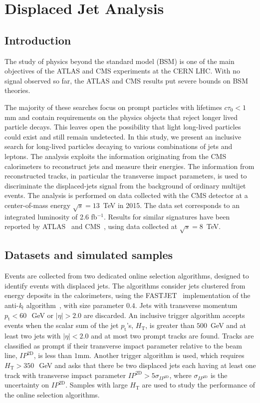 \chapter{Displaced Jet Analysis \label{ch:analysis}}

\section{Introduction}

The study of physics beyond the standard model (BSM) is one of the main
objectives of the ATLAS and CMS experiments at the CERN LHC. With no
signal observed so far, the ATLAS and CMS results put severe bounds on
BSM theories.

The majority of these searches focus on prompt particles with
lifetimes $c\tau_0<1$mm and contain requirements on the
physics objects that reject longer lived particle
decays. This leaves open the possibility that light long-lived particles
could exist and still remain undetected. In this study, we present an
inclusive search for long-lived particles decaying to various
combinations of jets and leptons. The analysis exploits the
information originating from the CMS calorimeters to reconstruct jets
and measure their energies. The information from reconstructed tracks,
in particular the transverse impact parameters, is used to
discriminate the displaced-jets signal from the background of ordinary
multijet events.  The analysis is performed on data collected with the
CMS detector at a center-of-mass energy $\sqrt{s}=13$~TeV in 2015. The
data set corresponds to an integrated luminosity of
2.6 fb$^{-1}$. Results for similar signatures have been reported by
ATLAS~\cite{PhysRevD.92.012010,Aad:2015rba} and
CMS~\cite{CMS:2014wda}, using data collected at $\sqrt{s}=8$~TeV.

\section{Datasets and simulated samples}
\label{sec:samples}

Events are collected from two dedicated online selection algorithms,
designed to identify events with displaced jets.  The algorithms
consider jets clustered from energy deposits in the calorimeters,
using the FASTJET~\cite{fastjet} implementation of the
anti-\textit{k}$_{\textit{t}}$ algorithm~\cite{Cacciari:2008gp}, with
size parameter $0.4$. Jets with transverse momentum $p_{\textrm{t}}<60~$~GeV or
$|\eta|>2.0$ are discarded.  An inclusive trigger algorithm accepts
events when the scalar sum of the jet $p_{\textrm{t}}$'s, $H_{\textrm{T}}$, is
greater than $500$~GeV and at least two jets with $|\eta|<2.0$ and at
most two prompt tracks are found. Tracks are classified as prompt if
their transverse impact parameter relative to the beam line,
$IP^{\textrm{2D}}$, is less than $1$mm.  Another trigger
algorithm is used, which requires $H_{\textrm{T}}>350~$~GeV and asks
that there be two displaced jets each having at least one track with
transverse impact parameter
$IP^{\textrm{2D}}>5\sigma_{IP^{\textrm{2D}}}$,
where $\sigma_{IP^{\textrm{2D}}}$ is the uncertainty on
$IP^{\textrm{2D}}$. Samples with large $H_{\textrm{T}}$ are used to
study the performance of the online selection algorithms. 

